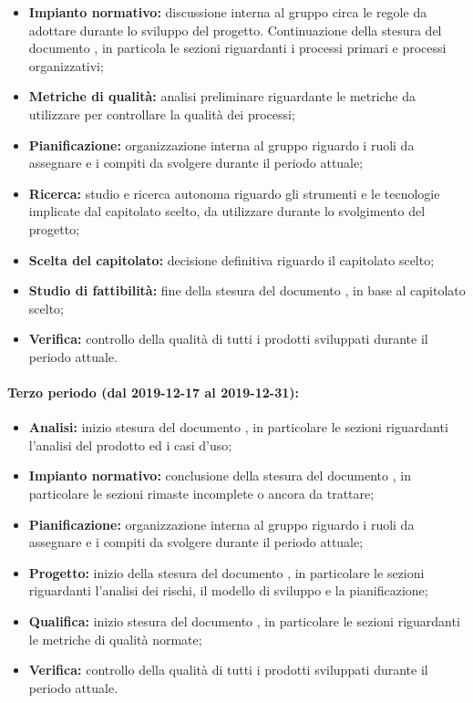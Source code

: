 				\begin{itemize}
					\item \textbf{Impianto normativo:} discussione interna al gruppo circa le regole da adottare durante lo sviluppo del progetto. Continuazione della stesura del documento , in particola le sezioni riguardanti i processi primari e processi organizzativi;
					\item \textbf{Metriche di qualità:} analisi preliminare riguardante le metriche da utilizzare per controllare la qualità dei processi;
					\item \textbf{Pianificazione:} organizzazione interna al gruppo riguardo i ruoli da assegnare e i compiti da svolgere durante il periodo attuale;
					\item \textbf{Ricerca:} studio e ricerca autonoma riguardo gli strumenti e le tecnologie implicate dal capitolato scelto, da utilizzare durante lo svolgimento del progetto;
					\item \textbf{Scelta del capitolato:} decisione definitiva riguardo il capitolato scelto;
					\item \textbf{Studio di fattibilità:} fine della stesura del documento , in base al capitolato scelto;
					\item \textbf{Verifica:} controllo della qualità di tutti i prodotti sviluppati durante il periodo attuale.
				\end{itemize}
			
			\paragraph{Terzo periodo (dal 2019-12-17 al 2019-12-31):}
			
				\begin{itemize}
					\item \textbf{Analisi:} inizio stesura del documento , in particolare le sezioni riguardanti l'analisi del prodotto ed i casi d'uso;
					\item \textbf{Impianto normativo:} conclusione della stesura del documento , in particolare le sezioni rimaste incomplete o ancora da trattare;
					\item \textbf{Pianificazione:} organizzazione interna al gruppo riguardo i ruoli da assegnare e i compiti da svolgere durante il periodo attuale;
					\item \textbf{Progetto:} inizio della stesura del documento , in particolare le sezioni riguardanti l'analisi dei rischi, il modello di sviluppo e la pianificazione;
					\item \textbf{Qualifica:} inizio stesura del documento , in particolare le sezioni riguardanti le metriche di qualità normate;
					\item \textbf{Verifica:} controllo della qualità di tutti i prodotti sviluppati durante il periodo attuale.
				\end{itemize}
			
